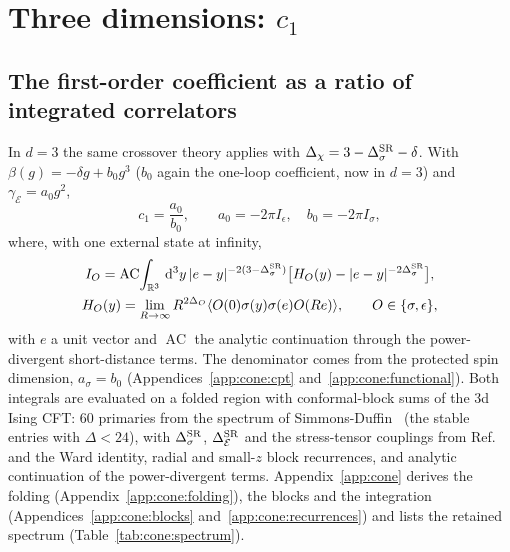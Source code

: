 \documentclass[11pt,a4paper]{article}
\numberwithin{equation}{section}
\newcommand{\dd}{\,\mathrm d}
\newcommand{\De}{\Delta_{\mathcal E}}
\newcommand{\Ds}{\Delta_\sigma}
\newcommand{\AC}{\operatorname{AC}}
\begin{document}
\section{Three dimensions: \texorpdfstring{$c_1$}{c1}}\label{sec:d3}
\subsection{The first-order coefficient as a ratio of integrated correlators}
In $d=3$ the same crossover theory applies with $\Delta_\chi=3-\Ds^{\rm SR}-\delta$. With
$\beta(g)=-\delta g+b_0g^3$ ($b_0$ again the one-loop coefficient, now in $d=3$) and $\gamma_{\mathcal E}=a_0g^2$,
\begin{equation}
 c_1=\frac{a_0}{b_0},\qquad a_0=-2\pi I_\epsilon,\quad b_0=-2\pi I_\sigma,
\end{equation}
where, with one external state at infinity,
\begin{equation}
\begin{gathered}
 I_O=\AC\!\int_{\mathbb R^3}\dd^3y\,|e-y|^{-2(3-\Ds^{\rm SR})}\bigl[H_O(y)-|e-y|^{-2\Ds^{\rm SR}}\bigr],\\
 H_O(y)=\lim_{R\to\infty}R^{2\Delta_O}\langle O(0)\sigma(y)\sigma(e)O(Re)\rangle,\qquad O\in\{\sigma,\epsilon\},
\end{gathered}
\end{equation}
with $e$ a unit vector and $\AC$ the analytic continuation through the power-divergent short-distance terms. The
denominator comes from the protected spin dimension, $a_\sigma=b_0$ (Appendices~\ref{app:cone:cpt}
and~\ref{app:cone:functional}). Both integrals are evaluated on a folded
region with conformal-block sums of the 3d Ising CFT: 60 primaries from the spectrum of
Simmons-Duffin~\cite{Simmons-Duffin:2016wlq} (the stable entries with $\Delta<24$), with $\Ds^{\rm SR}$, $\De^{\rm SR}$
and the stress-tensor couplings from Ref.~\cite{Chang:2024whx} and the Ward identity, radial and small-$z$ block
recurrences, and analytic continuation of the power-divergent terms. Appendix~\ref{app:cone} derives the folding
(Appendix~\ref{app:cone:folding}), the blocks and the integration (Appendices~\ref{app:cone:blocks}
and~\ref{app:cone:recurrences}) and lists the retained spectrum (Table~\ref{tab:cone:spectrum}).
\end{document}

